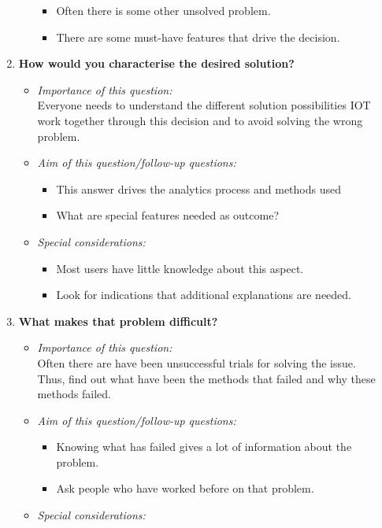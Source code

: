 \documentclass[a4paper, landscape, 6pt, fleqn]{scrartcl}
\renewcommand{\emph}[1]{\textbf{#1}}
\begin{document}
\begin{multicols*}{4}
\begin{enumerate}
\begin{itemize}
\begin{itemize}
\item Often there is some other unsolved problem.
\item There are some must-have features that drive the decision.
\end{itemize}
\end{itemize}
\item \emph{How would you characterise the desired solution?}
\begin{itemize}
\item \textit{Importance of this question:} \\
Everyone needs to understand the different solution possibilities IOT work together through this decision and to avoid solving the wrong problem.
\item \textit{Aim of this question/follow-up questions:}
\begin{itemize}
\item This answer drives the analytics process and methods used
\item What are special features needed as outcome?
\end{itemize}
\item \textit{Special considerations:}
\begin{itemize}
\item Most users have little knowledge about this aspect.
\item Look for indications that additional explanations are needed.
\end{itemize}
\end{itemize}
\item \emph{What makes that problem difficult?}
\begin{itemize}
\item \textit{Importance of this question:} \\
Often there are have been unsuccessful trials for solving the issue. \\
Thus, find out what have been the methods that failed and why these methods failed.
\item \textit{Aim of this question/follow-up questions:}
\begin{itemize}
\item Knowing what has failed gives a lot of information about the problem.
\item Ask people who have worked before on that problem.
\end{itemize}
\item \textit{Special considerations:}

\end{itemize}
\end{enumerate}
\end{multicols*}
\end{document}
